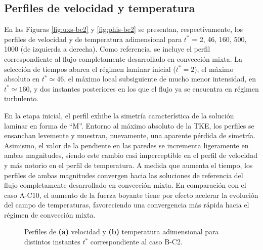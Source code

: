 \subsection{Perfiles de velocidad y temperatura}
En las Figuras \ref{fig:uxs-bc2} y \ref{fig:phis-bc2} se presentan, respectivamente, los perfiles de velocidad y de temperatura adimensional para $t^*$ = 2, 46, 160, 500, 1000 (de izquierda a derecha). Como referencia, se incluye el perfil correspondiente al flujo completamente desarrollado en convección mixta. La selección de tiempos abarca el régimen laminar inicial ($t^* = 2$), el máximo absoluto en $t^* \simeq 46$, el máximo local subsiguiente de mucho menor intensidad, en $t^* \simeq 160$, y dos instantes posteriores en los que el flujo ya se encuentra en régimen turbulento.

En la etapa inicial, el perfil exhibe la simetría característica de la solución laminar en forma de ``M''. Entorno al máximo absoluto de la TKE, los perfiles se ensanchan levemente y muestran, nuevamente, una aparente pérdida de simetría. Asimismo, el valor de la pendiente en las paredes se incrementa ligeramente en ambas magnitudes, siendo este cambio casi imperceptible en el perfil de velocidad y más notorio en el perfil de temperatura. A medida que aumenta el tiempo, los perfiles de ambas magnitudes convergen hacia las soluciones de referencia del flujo completamente desarrollado en convección mixta. En comparación con el caso A-C10, el aumento de la fuerza boyante tiene por efecto acelerar la evolución del campo de temperaturas, favoreciendo una convergencia más rápida hacia el régimen de convección mixta.

\begin{figure}[H]
  \centering  
  
  \caption{Perfiles de \textbf{(a)} velocidad y \textbf{(b)} temperatura adimensional para distintos instantes $t^*$ correspondiente al caso B-C2.}
    \label{fig:mosaico-bc2}
\end{figure}


